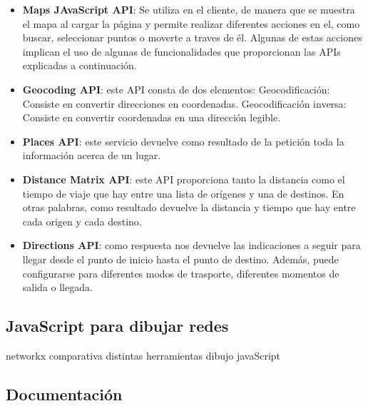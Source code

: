 \begin{itemize}
	\item \textbf{Maps JAvaScript API}: Se utiliza en el cliente, de manera que se muestra el mapa al cargar la página y permite realizar diferentes acciones en el, como buscar, seleccionar puntos o moverte a traves de él. Algunas de estas acciones implican el uso de algunas de funcionalidades que proporcionan las APIs explicadas a continuación.
	\item \textbf{Geocoding API}: este API consta de dos elementos:
	\subitem Geocodificación: Consiste en convertir direcciones en coordenadas.
	\subitem Geocodificación inversa: Consiste en convertir coordenadas en una dirección legible.
	\item \textbf{Places API}: este servicio devuelve como resultado de la petición toda la información acerca de un lugar.
	\item \textbf{Distance Matrix API}: este API proporciona tanto la distancia como el tiempo de viaje que hay entre una lista de orígenes y una de destinos. En otras palabras, como resultado devuelve la distancia y tiempo que hay entre cada origen y cada destino.
	\item \textbf{Directions API}: como respuesta nos devuelve las indicaciones a seguir para llegar desde el punto de inicio hasta el punto de destino. Además, puede configurarse para diferentes modos de trasporte, diferentes momentos de salida o llegada.
\end{itemize}




\subsection{JavaScript para dibujar redes}
networkx
comparativa distintas herramientas dibujo javaScript

\subsection{Documentación}



